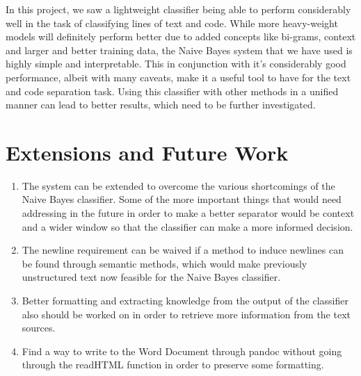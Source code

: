 \documentclass[12pt]{scrreprt}
\begin{document}
In this project, we saw a lightweight classifier being able to perform considerably well in the task of classifying lines of text and code. While more heavy-weight models will definitely perform better due to added concepts like bi-grams, context and larger and better training data, the Naive Bayes system that we have used is highly simple and interpretable. This in conjunction with it's considerably good performance, albeit with many caveats, make it a useful tool to have for the text and code separation task. Using this classifier with other methods in a unified manner can lead to better results, which need to be further investigated.


\chapter{Extensions and Future Work}

\begin{enumerate}
    \item The system can be extended to overcome the various shortcomings of the Naive Bayes classifier. Some of the more important things that would need addressing in the future in order to make a better separator would be context and a wider window so that the classifier can make a more informed decision.
    \item The newline requirement can be waived if a method to induce newlines can be found through semantic methods, which would make previously unstructured text now feasible for the Naive Bayes classifier. 
    \item Better formatting and extracting knowledge from the output of the classifier also should be worked on in order to retrieve more information from the text sources. 
    \item Find a way to write to the Word Document through pandoc without going through the readHTML function in order to preserve some formatting. 
\end{enumerate}
\end{document}
